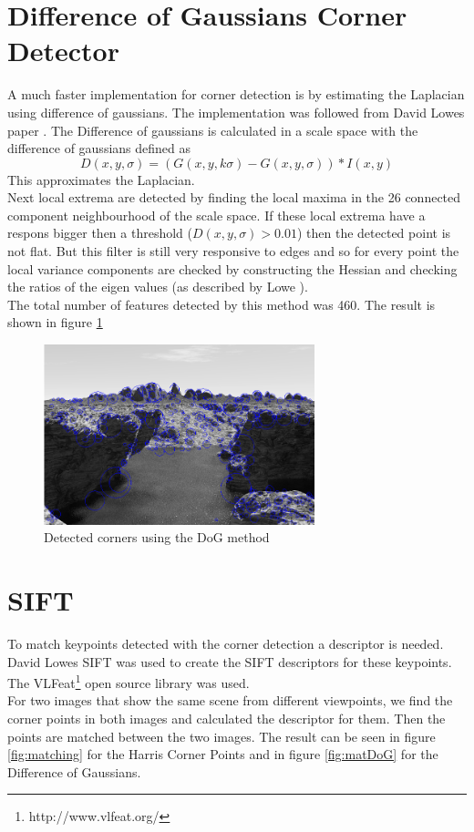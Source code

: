 \documentclass{article}
\begin{document}
\section{Difference of Gaussians Corner Detector}

A much faster implementation for corner detection is by estimating the Laplacian using difference of gaussians. The implementation was followed from David Lowes paper \cite{Lowe}. The Difference of gaussians is calculated in a scale space with the difference of gaussians defined as
\begin{equation}
D(x,y,\sigma) = (G(x,y,k\sigma) - G(x,y,\sigma)) * I(x,y)
\end{equation}
This approximates the Laplacian.\\
Next local extrema are detected by finding the local maxima in the 26 connected component neighbourhood of the scale space. If these local extrema have a respons bigger then a threshold ($D(x,y,\sigma) > 0.01$) then the detected point is not flat. But this filter is still very responsive to edges and so for every point the local variance components are checked by constructing the Hessian and checking the ratios of the eigen values (as described by Lowe \cite{Lowe}).\\
The total number of features detected by this method was 460. The result is shown in figure \ref{fig:DoG}

\begin{figure}[ht]
\centering
\includegraphics[width=0.7\textwidth]{img/DoG.png}
\caption{Detected corners using the DoG method}
\label{fig:DoG}
\end{figure}

\section{SIFT}
To match keypoints detected with the corner detection a descriptor is needed. David Lowes SIFT was used to create the SIFT descriptors for these keypoints. The VLFeat\footnote{http://www.vlfeat.org/} open source library was used. \\
For two images that show the same scene from different viewpoints, we find the corner points in both images and calculated the descriptor for them. Then the points are matched between the two images. The result can be seen in figure \ref{fig:matching} for the Harris Corner Points and in figure \ref{fig:matDoG} for the Difference of Gaussians.
\end{document}
